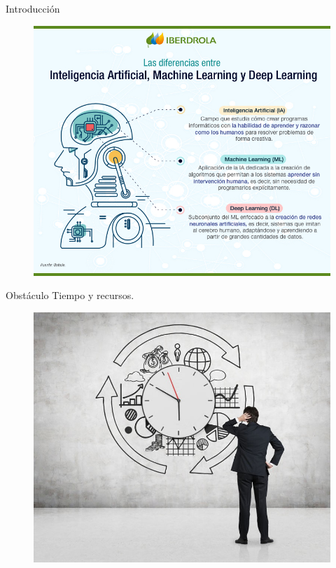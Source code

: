 \documentclass{beamer}
\begin{document}
\begin{frame}{Introducción}
\begin{figure}[h!t]
\centering
\includegraphics[scale = 1 ]{Deep_Learning_ESP.png}
\end{figure}
\end{frame}

\begin{frame}{Obstáculo}
    Tiempo y recursos.
        \begin{figure}[h!t]
        \centering
        \includegraphics[scale = 0.25 ]{imagen4.jpg}
        \end{figure}
\end{frame}
\end{document}
